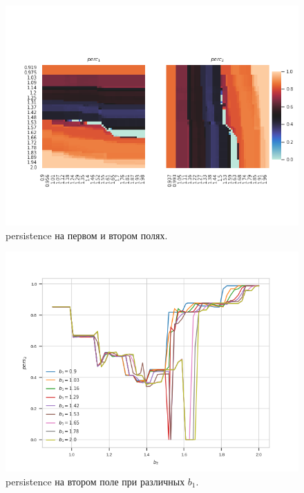 \documentclass[12pt]{article}
\begin{document}
        \begin{figure}[H]
            \centering
            \includegraphics[width=0.95\columnwidth, keepaspectratio=True]{DoubleField/persistence.png}
            \caption{persistence на первом и втором полях.}
            \label{fig:persDouble}
        \end{figure}
        \begin{figure}[H]
            \centering
            \includegraphics[width=0.95\columnwidth, keepaspectratio=True]{DoubleField/somepersistence.png}
            \caption{persistence на втором поле при различных $b_1$.}
            \label{fig:somepers}
        \end{figure}
        
\end{document}
